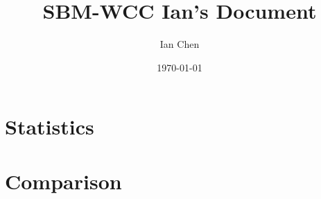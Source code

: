 \documentclass[aps,pre,superscriptaddress]{revtex4}
\begin{document}

\title{SBM-WCC Ian's Document}
\author{Ian Chen}
\date{\today}
\maketitle



\section{Statistics}

\section{Comparison}



\end{document}
